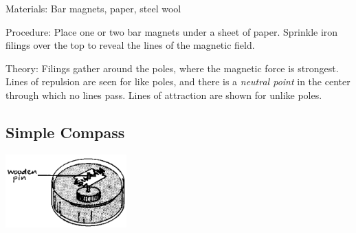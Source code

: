 \begin{multicols}{2}
\begin{description*}
\item[Materials:]{Bar magnets, paper, steel wool}
\item[Procedure:]{Place one or two bar magnets under a sheet of paper. Sprinkle iron filings over the top to reveal the lines of the magnetic field.}
\item[Theory:]{Filings gather around the poles, where the magnetic force is strongest. Lines of repulsion are seen for like poles, and there is a \emph{neutral point} in the center through which no lines pass. Lines of attraction are shown for unlike poles.}
\end{description*}

\columnbreak

\subsection{Simple Compass}

\begin{center}
\includegraphics[width=0.35\textwidth]{./img/source/compass.png}
\end{center}


\end{multicols}
